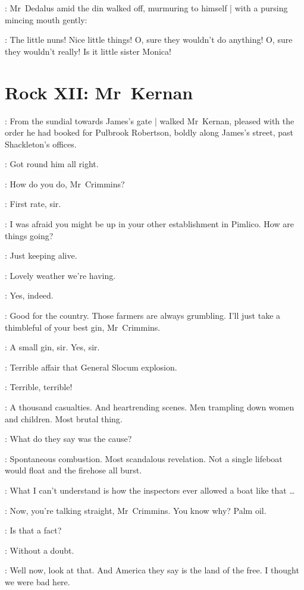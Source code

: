 :
Mr~Dedalus amid the din walked off,
murmuring to himself |
with a pursing mincing mouth gently:

\simon:
The little nuns!
Nice little things!
O, sure they wouldn't do anything!
O, sure they wouldn't really!
Is it little sister Monica!


\section*{Rock XII: Mr~Kernan}


:
From the sundial
towards James's gate |
walked Mr~Kernan,
pleased with the order he had booked for Pulbrook Robertson,
boldly along James's street,
past Shackleton's offices.%

:
Got round him all right.

:
How do you do, Mr~Crimmins?

\crimmins:
First rate, sir.

:
I was afraid you might be up in your other establishment in Pimlico.
How are things going?

\crimmins:
Just keeping alive.

:
Lovely weather we're having.

\crimmins:
Yes, indeed.

:
Good for the country.
Those farmers are always grumbling.
I'll just take a thimbleful of your best gin, Mr~Crimmins.

\crimmins:
A small gin, sir.
Yes, sir.

:
Terrible affair that General Slocum explosion.

\crimmins:
Terrible, terrible!

:
A thousand casualties.
And heartrending scenes.
Men trampling down women and children.
Most brutal thing.

\crimmins:
What do they say was the cause?

:
Spontaneous combustion.
Most scandalous revelation.
Not a single lifeboat would float and the firehose all burst.

\crimmins:
What I can't understand%
is how the inspectors ever allowed a boat like that \ldots

:
Now, you're talking straight, Mr~Crimmins.
You know why?
Palm oil.

\crimmins:
Is that a fact?

:
Without a doubt.

\crimmins:
Well now, look at that.
And America they say is the land of the free.
I thought we were bad here.

